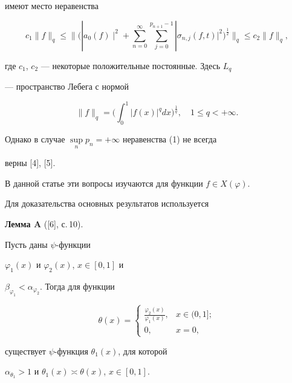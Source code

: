 имеют место неравенства


\begin{equation}


c_{1}\|f\|_{q}\leq\bigg\|\bigg(|a_{0}(f)\mid^{2}+\sum_{n=0}^{\infty} 


\sum_{j=0}^{p_{n+1}-1}|\sigma_{n,j}(f,t)|^{2}\bigg)^{\frac{1}{2}}\bigg\|_{q}


\leq c_{2}\|f\|_{q},


\end{equation}


где $c_{1}$, $c_{2}$ --- некоторые положительные постоянные. Здесь $L_{q}$ 


--- пространство Лебега с нормой 


$$


\|f\|_{q}=\bigg(\int_{0}^{1}|f(x)|^{q}dx\bigg)^{\frac{1}{q}},\quad 1\leq 


q<+\infty .


$$


Однако в случае $\sup\limits_{n}p_{n}=+\infty$ неравенства (1) не всегда 


верны [4], [5].





В данной статье эти вопросы изучаются для функции $f\in X(\varphi)$.


Для доказательства основных результатов используется


\medskip





{\bf Лемма A} ([6], с.\,10). {\it 


Пусть даны $\psi$-функции


$\varphi_{1}(x)$ и $\varphi_{2}(x)$, $x\in [0,1]$ и


$\beta_{\varphi_{1}}<\alpha_{\varphi_{2}}$. Тогда для функции


$$


\theta (x)=


\begin{cases}


\frac{\varphi_{2}(x)}{\varphi_{1}(x)},& x\in (0, 1];\\


0,& x=0,


\end{cases}


$$


существует $\psi$-функция $\theta_{1}(x)$, для которой 


$\alpha_{\theta_{1}}>1$ и $\theta_{1}(x)\asymp\theta(x)$, $x\in [0, 1]$. 


}





